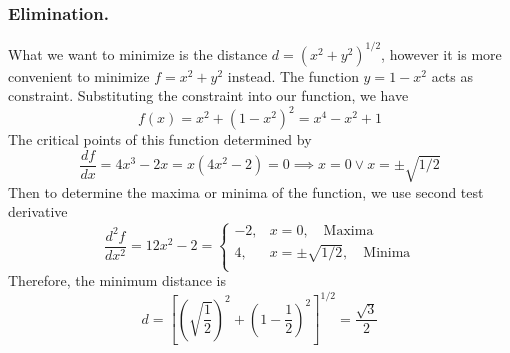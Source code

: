 \documentclass[../main.tex]{subfiles}
\begin{document}
\subsubsection{Elimination.} What we want to minimize is the distance $d=({x^2+y^2})^{1/2}$, however it is more convenient to minimize $f=x^2+y^2$ instead. The function $y=1-x^2$ acts as constraint. Substituting the constraint into our function, we have 
\begin{equation*}
    f(x)=x^2+(1-x^2)^2=x^4-x^2+1
\end{equation*}
The critical points of this function determined by 
\begin{equation*}
    \frac{df}{dx}=4x^3-2x=x(4x^2-2)=0\implies x=0\lor x=\pm\sqrt{1/2}
\end{equation*}
Then to determine the maxima or minima of the function, we use second test derivative 
\begin{equation*}
    \frac{d^2f}{dx^2}=12x^2-2=\begin{cases}
        -2, &x=0, \quad\text{Maxima}\\
        4, &x=\pm \sqrt{1/2},\quad \text{Minima}\\
    \end{cases}
\end{equation*}
Therefore, the minimum distance is 
\begin{equation*}
    d=\left[\left(\sqrt{\frac{1}{2}}\right)^2+\left(1-\frac{1}{2}\right)^2\right]^{1/2}=\frac{\sqrt{3}}{2}
\end{equation*}
\end{document}
